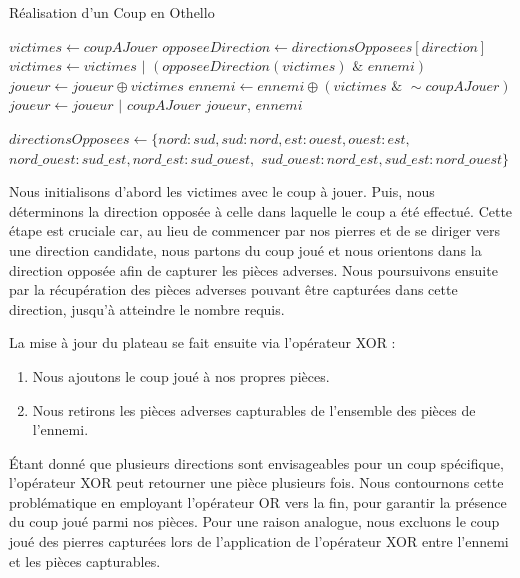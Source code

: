 \begin{algorithm}
    \caption{Réalisation d'un Coup en Othello}
    \begin{algorithmic}[1]
            \State $victimes \gets coupAJouer$
            \State $opposeeDirection \gets directionsOpposees[direction]$
                \State $victimes \gets victimes \,\, | \,\,(opposeeDirection(victimes) \,\, \& \,\, ennemi)$
            \EndFor
            \State $joueur \gets joueur \oplus victimes$
            \State $ennemi \gets ennemi \oplus (victimes \,\, \& \,\, \sim coupAJouer)$
        \EndFor
        \State $joueur \gets joueur \,\, | \,\, coupAJouer$
        \State \Return $joueur$, $ennemi$
    \EndFunction

    \State
    \State $directionsOpposees \gets \{nord: sud, sud: nord, est: ouest, ouest: est,$
    \Statex \hspace{\algorithmicindent} $nord\_ouest: sud\_est, nord\_est: sud\_ouest,$
    \Statex \hspace{\algorithmicindent} $sud\_ouest: nord\_est, sud\_est: nord\_ouest\}$
    \end{algorithmic}
    \label{alg:play_move}
\end{algorithm}
Nous initialisons d'abord les victimes avec le coup à jouer. Puis, nous déterminons la direction opposée à celle dans laquelle le coup a été effectué. Cette étape est cruciale car, au lieu de commencer par nos pierres et de se diriger vers une direction candidate, nous partons du coup joué et nous orientons dans la direction opposée afin de capturer les pièces adverses. Nous poursuivons ensuite par la récupération des pièces adverses pouvant être capturées dans cette direction, jusqu'à atteindre le nombre requis.

La mise à jour du plateau se fait ensuite via l'opérateur XOR :
\begin{enumerate}
    \item Nous ajoutons le coup joué à nos propres pièces.
    \item Nous retirons les pièces adverses capturables de l'ensemble des pièces de l'ennemi.
\end{enumerate}

Étant donné que plusieurs directions sont envisageables pour un coup spécifique, l'opérateur XOR peut retourner une pièce plusieurs fois. Nous contournons cette problématique en employant l'opérateur OR vers la fin, pour garantir la présence du coup joué parmi nos pièces. Pour une raison analogue, nous excluons le coup joué des pierres capturées lors de l'application de l'opérateur XOR entre l'ennemi et les pièces capturables.

